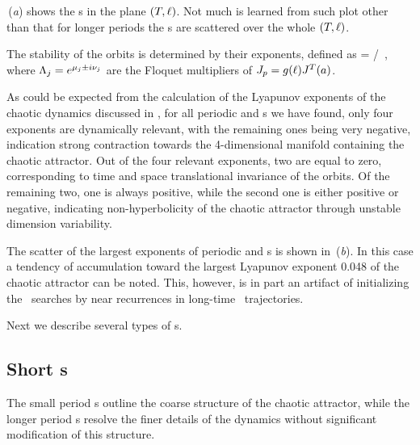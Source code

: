 \,(\textit{a}) shows the \rpo s in the plane
$(\period{},\shift)$.  Not much is learned from such plot other than
that for longer periods the \rpo s are scattered over the
whole $(\period{},\shift)$.

The stability of the orbits is determined by their  exponents,
defined as
\beq
{} = \eigRe[j]/\period{} \,,
where $\ExpaEig_j = e^{\eigRe[j] \pm i \eigIm[j]}$ are the
Floquet multipliers of $\jMps_p = g(\shift)J^T(a)$.


As could be expected from the calculation of the Lyapunov exponents
of the chaotic dynamics discussed in , for all
periodic and \rpo s we have found, only four 
exponents are dynamically relevant, with the remaining ones being
very negative, indication strong contraction towards the
4-dimensional manifold containing the chaotic attractor.  Out of the
four relevant exponents, two are equal to zero, corresponding to
time and space translational invariance of the orbits.  Of the
remaining two, one is always positive, while the second one is
either positive or negative, indicating non-hyperbolicity of the
chaotic attractor through unstable dimension
variability.

The scatter of the %
largest  exponents
of periodic and \rpo s is shown in \,(\textit{b}).
In this case a tendency of accumulation toward the largest
Lyapunov exponent 0.048 of the chaotic attractor
can be noted.  This, however, is in part an artifact of initializing
the \rpo\ searches by near recurrences in
long-time \statesp\ trajectories.

Next we describe several types of \rpo s.

\subsection{Short \rpo s}

The small period \rpo s outline the
coarse structure of the chaotic attractor, while the longer period
\rpo s resolve the finer details of the dynamics
without significant modification of this structure.

